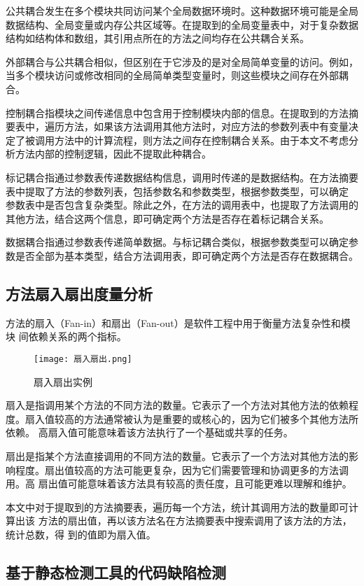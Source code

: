 公共耦合发生在多个模块共同访问某个全局数据环境时。这种数据环境可能是全局数据结构、全局变量或内存公共区域等。在提取到的全局变量表中，对于复杂数据结构如结构体和数组，其引用点所在的方法之间均存在公共耦合关系。


外部耦合与公共耦合相似，但区别在于它涉及的是对全局简单变量的访问。例如，当多个模块访问或修改相同的全局简单类型变量时，则这些模块之间存在外部耦合。


控制耦合指模块之间传递信息中包含用于控制模块内部的信息。在提取到的方法摘
要表中，遍历方法，如果该方法调用其他方法时，对应方法的参数列表中有变量决定了被调用方法中的计算流程，则方法之间存在控制耦合关系。由于本文不考虑分析方法内部的控制逻辑，因此不提取此种耦合。


标记耦合指通过参数表传递数据结构信息，调用时传递的是数据结构。在方法摘要
表中提取了方法的参数列表，包括参数名和参数类型，根据参数类型，可以确定
参数表中是否包含复杂类型。除此之外，在方法的调用表中，也提取了方法调用的
其他方法，结合这两个信息，即可确定两个方法是否存在着标记耦合关系。


数据耦合指通过参数表传递简单数据。与标记耦合类似，根据参数类型可以确定参
数是否全部为基本类型，结合方法调用表，即可确定两个方法是否存在数据耦合。
\subsection{方法扇入扇出度量分析}

方法的扇入（Fan-in）和扇出（Fan-out）是软件工程中用于衡量方法复杂性和模块
间依赖关系的两个指标。

\begin{figure}[h]
\centering
\texttt{[image: 扇入扇出.png]}
\caption{扇入扇出实例}
\end{figure}
    

扇入是指调用某个方法的不同方法的数量。它表示了一个方法对其他方法的依赖程
度。扇入值较高的方法通常被认为是重要的或核心的，因为它们被多个其他方法所依赖。
高扇入值可能意味着该方法执行了一个基础或共享的任务。


扇出是指某个方法直接调用的不同方法的数量。它表示了一个方法对其他方法的影
响程度。扇出值较高的方法可能更复杂，因为它们需要管理和协调更多的方法调用。高
扇出值可能意味着该方法具有较高的责任度，且可能更难以理解和维护。


本文中对于提取到的方法摘要表，遍历每一个方法，统计其调用方法的数量即可计算出该
方法的扇出值，再以该方法名在方法摘要表中搜索调用了该方法的方法，统计总数，得
到的值即为扇入值。

\subsection{基于静态检测工具的代码缺陷检测}


